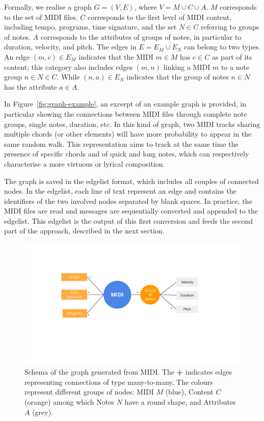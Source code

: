 \documentclass{article}
\newcommand{\figref}[1]{\mbox{Figure~\ref{#1}}}
\begin{document}
Formally, we realise a graph $G = (V,E)$, where $V = M \cup C \cup A$. $M$ corresponds to the set of MIDI files. $C$ corresponds to the first level of MIDI content, including tempo, programs, time signature, and the set $N \in C$ referring to groups of notes. $A$ corresponds to the attributes of groups of notes, in particular to duration, velocity, and pitch. The edges in $E = E_M \cup E_N$ can belong to two types. An edge $(m,c) \in E_M$ indicates that the MIDI $m \in M$ has $c \in C$ as part of its content; this category also includes edges $(m,n)$ linking a MIDI $m$ to a note group $n \in N \in C$. While $(n,a) \in E_N$ indicates that the group of notes $n \in N$ has the attribute $a \in A$.

In \figref{fig:graph-example}, an excerpt of an example graph is provided, in particular showing the connections between MIDI files through complete note groups, single notes, duration, etc. In this kind of graph, two MIDI tracks sharing multiple chords (or other elements) will have more probability to appear in the same random walk. This representation aims to track at the same time the presence of specific chords and of quick and long notes, which can respectively characterise a more virtuous or lyrical composition.

The graph is saved in the edgelist format, which includes all couples of connected nodes. In the edgelist, each line of text represent an edge and contains the identifiers of the two involved nodes separated by blank spaces. In practice, the MIDI files are read and messages are sequentially converted and appended to the edgelist. This edgelist is the output of this first conversion and feeds the second part of the approach, described in the next section.

\begin{figure}[ht!]
 \centerline{
 \includegraphics[width=\columnwidth]{figs/schema-midi-graph.pdf}}
 \caption{Schema of the graph generated from MIDI. The \textbf{+} indicates edges representing connections of type many-to-many. The colours represent  different groups of nodes: MIDI $M$ (blue), Content $C$ (orange) among which Notes $N$ have a round shape, and Attributes $A$ (grey). }
 \label{fig:schema-midi-graph}
\end{figure}
\end{document}
